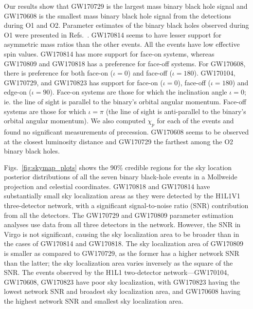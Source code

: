 Our results show that GW170729 is the largest mass binary black hole signal and GW170608 is the smallest mass binary black hole signal from the detections during O1 and O2. Parameter estimates of the binary black holes observed during O1 were presented in Refs.~\cite{Biwer:2018osg, TheLIGOScientific:2016pea}.
GW170814 seems to have lesser support for asymmetric mass ratios than the other events. All the events have low effective spin values. GW170814 has more support for face-on systems, whereas GW170809 and GW170818 has a preference for face-off systems. For GW170608, there is preference for both face-on ($\iota = 0$) and face-off ($\iota = 180$). GW170104, GW170729, and GW170823 has support for face-on ($\iota = 0$), face-off ($\iota = 180$) and edge-on ($\iota = 90$). Face-on systems are those for which the inclination angle $\iota = 0$; ie. the line of sight is parallel to the binary's orbital angular momentum. Face-off systems are those for which $\iota = \pi$ (the line of sight is anti-parallel to the binary's orbital angular momentum). We also computed $\chi_{p}$ for each of the events and found no significant measurements of precession. GW170608 seems to be observed at the closest luminosity distance and GW170729 the farthest among the O2 binary black holes.

Figs.~\ref{fig:skymap_plots} shows the 90\% credible regions for the sky location posterior distributions of all the seven binary black-hole events in a Mollweide projection and celestial coordinates. GW170818 and GW170814 have substantially small sky localization areas as they were detected by the H1L1V1 three-detector network, with a significant signal-to-noise ratio (SNR) contribution from all the detectors. The GW170729 and GW170809 parameter estimation analyses use data from all three detectors in the network. However, the SNR in Virgo is not significant, causing the sky localization area to be broader than in the cases of GW170814 and GW170818.  The sky localization area of GW170809 is smaller as compared to GW170729, as the former has a higher network SNR than the latter; the sky localization area varies inversely as the square of the SNR. The events observed by the H1L1 two-detector network---GW170104, GW170608, GW170823 have poor sky localization, with GW170823 having the lowest network SNR and broadest sky localization area, and GW170608 having the highest network SNR and smallest sky localization area.

